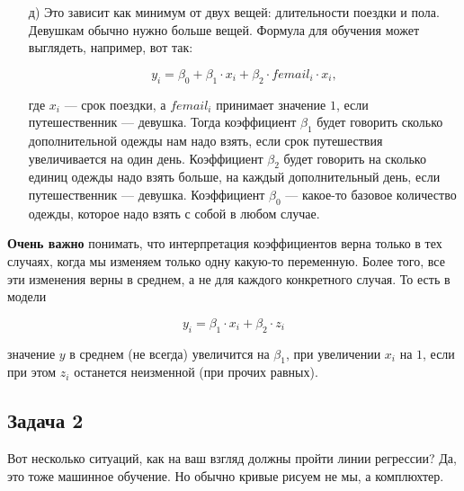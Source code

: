 \documentclass[12pt, a4paper, oneside]{article}
\begin{document}
{\begin{enumerate}
	\[ \ln y_i = \beta_0 + \beta_1 \cdot \ln x_i + \beta_2 \cdot \ln z_i + \beta_3 \cdot fat_i.\]
	
	Тогда после оценивания модели коэффициент $\beta_3$ будет отражать то, сколько шашлыка надо взять чисто для толстого друга. 
	
	\item[д)]  Это зависит как минимум от двух вещей: длительности поездки и пола. Девушкам обычно нужно больше вещей. Формула для обучения может выглядеть, например, вот так: 
	
	\[ 
	y_i = \beta_0 + \beta_1 \cdot  x_i + \beta_2 \cdot femail_i \cdot x_i,
	\]
	
	где $x_i$ --- срок поездки, а $femail_i$ принимает значение $1$, если путешественник --- девушка. Тогда коэффициент $\beta_1$ будет говорить сколько дополнительной одежды нам надо взять, если срок путешествия увеличивается на один день. Коэффициент $\beta_2$ будет говорить на сколько единиц одежды надо взять больше, на каждый дополнительный день, если путешественник --- девушка. Коэффициент $\beta_0$ --- какое-то базовое количество одежды, которое надо взять с собой в любом случае. 
\end{enumerate}	

\textbf{Очень важно} понимать, что интерпретация коэффициентов верна только в тех случаях, когда мы изменяем только одну какую-то переменную. Более того, все эти изменения верны в среднем, а не для каждого конкретного случая. То есть в модели 

\[ y_i = \beta_1 \cdot  x_i + \beta_2 \cdot  z_i \]

значение $y$ в среднем (не всегда) увеличится на $\beta_1$, при увеличении $x_i$ на $1$, если при этом $z_i$ останется неизменной (при прочих равных).
}


\subsection*{Задача 2}

Вот несколько ситуаций, как на ваш взгляд должны пройти линии регрессии? Да, это тоже машинное обучение. Но обычно кривые рисуем не мы, а комплюхтер.
\end{document}
